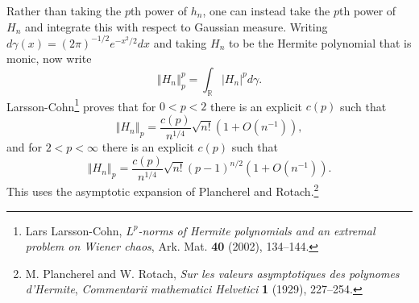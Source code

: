 \documentclass{article}
\newcommand{\norm}[1]{\left\Vert #1 \right\Vert}
\theoremstyle{definition}
\begin{document}
Rather than taking the $p$th power of $h_n$, one can instead take the $p$th power of $H_n$ and integrate this with respect to Gaussian measure. Writing
$d\gamma(x) = (2\pi)^{-1/2} e^{-x^2/2}dx$ and taking $H_n$ to be the Hermite polynomial that is monic, now write
\[
\norm{H_n}_p^p = \int_{\mathbb{R}} |H_n|^p d\gamma.
\]
Larsson-Cohn\footnote{Lars Larsson-Cohn, {\em $L^p$-norms of Hermite polynomials and an extremal problem on Wiener chaos},
Ark. Mat. \textbf{40} (2002), 134--144.} proves that for $0<p<2$ there is an explicit $c(p)$ such that 
\[
\norm{H_n}_p = \frac{c(p)}{n^{1/4}} \sqrt{n!} (1+O(n^{-1})),
\]
and for $2<p<\infty$ there is an explicit $c(p)$ such that
\[
\norm{H_n}_p = \frac{c(p)}{n^{1/4}} \sqrt{n!} (p-1)^{n/2} (1+O(n^{-1})).
\]
This uses the asymptotic expansion of Plancherel and Rotach.\footnote{M. Plancherel and W. Rotach, {\em Sur les valeurs asymptotiques des polynomes d'Hermite},
{\em Commentarii mathematici Helvetici} \textbf{1} (1929), 227--254.}
\end{document}

